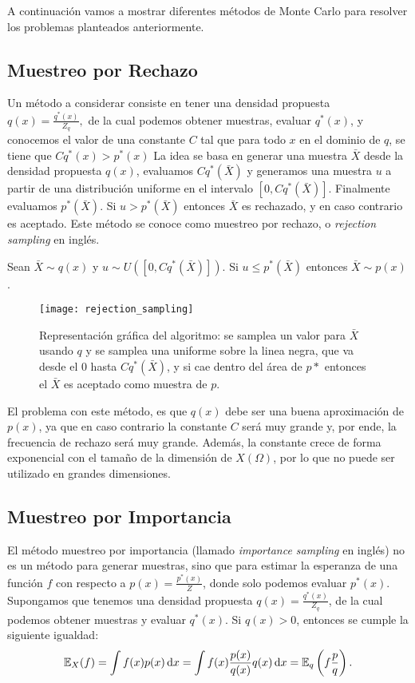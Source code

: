 A continuación vamos a mostrar diferentes métodos de Monte Carlo para resolver los problemas planteados anteriormente.

\subsection{Muestreo por Rechazo}
Un método a considerar consiste en tener una densidad propuesta \(q(x) = \frac{q^{\ast}(x)}{Z_q},\) de la cual podemos obtener muestras, evaluar \(q^{\ast}(x)\), y conocemos el valor de una constante \(C\) tal que para todo \(x\) en el dominio de \(q\), se tiene que \(C q^{\ast}(x) > p^{\ast}(x)\) La idea se basa en generar una muestra \(\bar{X}\) desde la densidad propuesta \(q(x)\), evaluamos \(C q^{\ast}(\bar{X})\) y generamos una muestra \(u\) a partir de una distribución uniforme en el intervalo \([0, C q^{\ast}(\bar{X})].\) Finalmente evaluamos \(p^{\ast}(\bar{X})\). Si \(u > p^{\ast}(\bar{X})\) entonces \(\bar{X}\) es rechazado, y en caso contrario es aceptado. Este método se conoce como muestreo por rechazo, o \emph{rejection sampling} en inglés.

\begin{proposition}
	Sean \(\bar{X} \sim q(x)\) y \(u \sim U([0,Cq^\ast(\bar{X})])\). Si \(u \leq p^\ast(\bar{X})\) entonces \(\bar{X} \sim p(x)\).
\end{proposition}

\begin{figure}[h]
	\centering
	\texttt{[image: rejection\_sampling]}
	\caption{Representación gráfica del algoritmo: se samplea un valor para \(\bar{X}\) usando \(q\) y se samplea una uniforme sobre la linea negra, que va desde el 0 hasta \(Cq^\ast(\bar{X})\), y si cae dentro del área de \(p*\) entonces el \(\bar{X}\) es aceptado como muestra de \(p\).}
	\label{fig:rejection_sampling}
\end{figure}
El problema con este método, es que \(q(x)\) debe ser una buena aproximación de \(p(x)\), ya que en caso contrario la constante \(C\) será muy grande y, por ende, la frecuencia de rechazo será muy grande. Además, la constante crece de forma exponencial con el tamaño de la dimensión de \(X(\Omega)\), por lo que no puede ser utilizado en grandes dimensiones.

\subsection{Muestreo por Importancia}

El método muestreo por importancia (llamado \emph{importance sampling} en inglés) no es un método para generar muestras, sino que para estimar la esperanza de una función \(f\) con respecto a \(p(x) = \frac{p^{\ast}(x)}{Z}\), donde solo podemos evaluar \(p^{\ast}(x)\). Supongamos que tenemos una densidad propuesta \(q(x) = \frac{q^{\ast}(x)}{Z_q}\), de la cual podemos obtener muestras y evaluar \(q^{\ast}(x)\). Si \(q(x) > 0\), entonces se cumple la siguiente igualdad: 
\begin{equation*}
\mathbb{E}_{X}(f) = \int f(x) p(x) \dd{x} = \int f(x) \frac{p(x)}{q(x)} q(x) \dd{x} = \mathbb{E}_{q}\left(f\frac{p}{q}\right).
\end{equation*}

